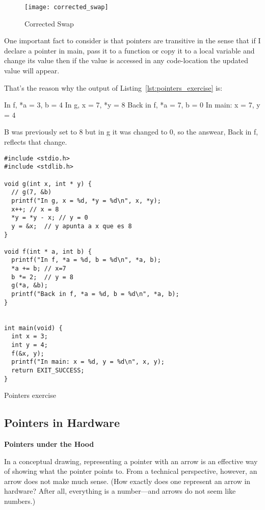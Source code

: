 \documentclass[11pt, a4paper]{article}
\begin{document}
\begin{figure}[htpb]
  \centering
  \texttt{[image: corrected\_swap]}
  \caption{Corrected Swap}
  \label{fig:correctedswap}
\end{figure}




One important fact to consider is that pointers are transitive in the sense that if I declare a pointer in main, pass it to a function or copy it to a local variable and change its value then if the value is accessed in any code-location the updated value will appear.

That's the reason why the output of Listing~\ref{lst:pointers_exercise} is:

In f, *a = 3, b = 4
In g, x = 7, *y = 8
Back in f, *a = 7, b = 0
In main: x = 7, y = 4

B was previously set to 8 but in g it was changed to 0, so the answear, Back in f, reflects that change.


\begin{listing}
\begin{verbatim}
#include <stdio.h>
#include <stdlib.h>

void g(int x, int * y) {
  // g(7, &b)
  printf("In g, x = %d, *y = %d\n", x, *y);
  x++; // x = 8
  *y = *y - x; // y = 0
  y = &x;  // y apunta a x que es 8
}

void f(int * a, int b) {
  printf("In f, *a = %d, b = %d\n", *a, b);
  *a += b; // x=7
  b *= 2;  // y = 8
  g(*a, &b);
  printf("Back in f, *a = %d, b = %d\n", *a, b);
}


int main(void) {
  int x = 3;
  int y = 4;
  f(&x, y);
  printf("In main: x = %d, y = %d\n", x, y);
  return EXIT_SUCCESS;
}
\end{verbatim}
\caption{Pointers exercise}
\label{lst:pointers_exercise}
\end{listing}



\subsection{Pointers in Hardware}%
\label{sub:pointers_in_hardware}



\textbf{Pointers under the Hood}


In a conceptual drawing, representing a pointer with an arrow is an effective way of showing what the pointer points to. From a technical perspective, however, an arrow does not make much sense. (How exactly does one represent an arrow in hardware? After all, everything is a number—and arrows do not seem like numbers.)
\end{document}
